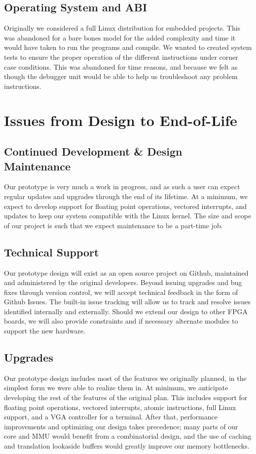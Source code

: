 \documentclass{article}
\begin{document}
\subsection{Operating System and ABI}
Originally we considered a full Linux distribution for embedded projects. This was abandoned for a bare bones model for the added complexity and time it would have taken to run the programs and compile. We wanted to created system tests to ensure the proper operation of the different instructions under corner case conditions. This was abandoned for time reasons, and because we felt as though the debugger unit would be able to help us troubleshoot any problem instructions.


\section{Issues from Design to End-of-Life}

\subsection{Continued Development \& Design Maintenance}
Our prototype is very much a work in progress, and as such a user can expect regular updates and upgrades through the end of its lifetime.  At a minimum, we expect to develop support for floating point operations, vectored interrupts, and updates to keep our system compatible with the Linux kernel.  The size and scope of our project is such that we expect maintenance to be a part-time job.

\subsection{Technical Support}
Our prototype design will exist as an open source project on Github, maintained and administered by the original developers.  Beyond issuing upgrades and bug fixes through version control, we will accept technical feedback in the form of Github Issues.  The built-in issue tracking will allow us to track and resolve issues identified internally and externally.  Should we extend our design to other FPGA boards, we will also provide constraints and if necessary alternate modules to support the new hardware.

\subsection{Upgrades}
Our prototype design includes most of the features we originally planned, in the simplest form we were able to realize them in.  At minimum, we anticipate developing the rest of the features of the original plan.  This includes support for floating point operations, vectored interrupts, atomic instructions, full Linux support, and a VGA controller for a terminal.  After that, performance improvements and optimizing our design takes precedence; many parts of our core and MMU would benefit from a combinatorial design, and the use of caching and translation lookaside buffers would greatly improve our memory bottlenecks.
\end{document}
